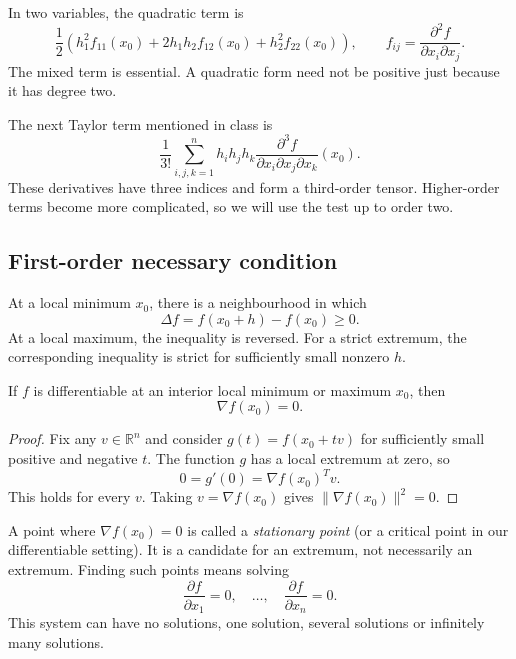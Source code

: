 In two variables, the quadratic term is
\[
 \frac12\left(h_1^2 f_{11}(x_0)
 +2h_1h_2 f_{12}(x_0)+h_2^2 f_{22}(x_0)\right),
 \qquad f_{ij}=\frac{\partial^2 f}{\partial x_i\partial x_j}.
\]
The mixed term is essential. A quadratic form need not be positive just because it has degree two.

The next Taylor term mentioned in class is
\[
 \frac{1}{3!}\sum_{i,j,k=1}^n
 h_i h_j h_k\frac{\partial^3f}{\partial x_i\partial x_j\partial x_k}(x_0).
\]
These derivatives have three indices and form a third-order tensor. Higher-order terms become more complicated, so we will use the test up to order two.

\subsection{First-order necessary condition}
At a local minimum $x_0$, there is a neighbourhood in which
\[
 \Delta f=f(x_0+h)-f(x_0)\ge0.
\]
At a local maximum, the inequality is reversed. For a strict extremum, the corresponding inequality is strict for sufficiently small nonzero $h$.

\begin{proposition}
If $f$ is differentiable at an interior local minimum or maximum $x_0$, then
\begin{equation}
 \nabla f(x_0)=0.
 \label{eq:lec07-first-order}
\end{equation}
\end{proposition}
\begin{proof}
Fix any $v\in\mathbb{R}^n$ and consider $g(t)=f(x_0+tv)$ for sufficiently small positive and negative $t$. The function $g$ has a local extremum at zero, so
\[
 0=g'(0)=\nabla f(x_0)^Tv.
\]
This holds for every $v$. Taking $v=\nabla f(x_0)$ gives $\|\nabla f(x_0)\|^2=0$.
\end{proof}
A point where $\nabla f(x_0)=0$ is called a \emph{stationary point} (or a critical point in our differentiable setting). It is a candidate for an extremum, not necessarily an extremum. Finding such points means solving
\[
 \frac{\partial f}{\partial x_1}=0,\quad\ldots,\quad
 \frac{\partial f}{\partial x_n}=0.
\]
This system can have no solutions, one solution, several solutions or infinitely many solutions.


